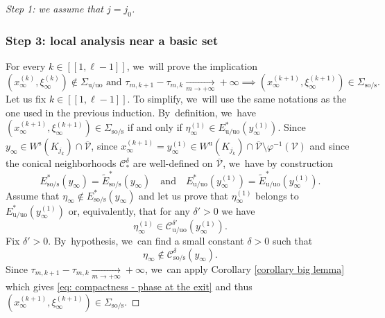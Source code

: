 \documentclass[JEP,XML,SOM,Unicode,NoEqCountersInSection,NoFloatCountersInSection,published]{cedram}
\newcommand{\lcr}{[\![}
\newcommand{\rcr}{]\!]}
\newcommand{\rs}{\mathrm{s}}
\newcommand{\rso}{\mathrm{so}}
\newcommand{\ru}{\mathrm{u}}
\newcommand{\ruo}{\mathrm{uo}}
\theoremstyle{definition}
\theoremstyle{plain}
\newcommand{\Ccal}{\mathcal{C}}
\newcommand{\Vcal}{\mathcal{V}}
\begin{document}
\begin{proof}[Step 1: we assume that $j = j_0$]
\subsubsection*{Step 3: local analysis near a basic set}
For every $k\in\lcr1,\ell-1\rcr$, we~will prove the implication
\begin{equation}\label{eq: compactness - proof implication}
(x_{\infty}^{(k)}, \xi_{\infty}^{(k)}) \!\notin\! \Sigma_{\ru/\ruo} \text{ and } \tau_{m,k +1} - \tau_{m,k} \!\underset{m\to+\infty}{\to}\! + \infty \implies (x_{\infty}^{(k+1)}, \xi_{\infty}^{(k+1)}) \!\in\! \Sigma_{\rso/\rs}.
\end{equation}
Let us fix $k\in\lcr1,\ell-1\rcr$. To simplify, we~will use the same notations as the one used in the previous induction. By~definition, we~have $(x_\infty^{(k+1)},\xi_\infty^{(k+1)}) \in \Sigma_{\rso/\rs}$ if and only if $\eta_{\infty}^{(1)} \in E_{\ru/\ruo}^* (y_{\infty}^{(1)})$. Since $y_{\infty} \in W^\rs (K_{j_k}) \cap \overline{\Vcal}$, since $x_{\infty}^{(k+1)} = y_{\infty}^{(1)} \in W^\ru (K_{j_k}) \cap \overline{\Vcal} \setminus \varphi^{-1} (\Vcal)$ and since the conical neighborhoods $\Ccal_{*}^{\delta}$ are well-defined on $\overline{\Vcal}$, we~have by construction
\[
E_{\rso/\rs}^* (y_{\infty}) = \widetilde{E}_{\rso/\rs}^* (y_{\infty}) \quad \text{and} \quad E_{\ru/\ruo}^* (y_{\infty}^{(1)}) = \widetilde{E}_{\ru/\ruo}^* (y_{\infty}^{(1)}).
\]
Assume that $\eta_{\infty} \notin E_{\rso/\rs}^* (y_{\infty})$ and let us prove that $\eta_{\infty}^{(1)}$ belongs to $E_{\ru/\ruo}^* (y_{\infty}^{(1)})$ or, equivalently, that for any $\delta' > 0$ we have
\begin{equation}\label{eq: compactness - phase at the exit}
\eta_{\infty}^{(1)} \in \Ccal_{\ru/\ruo}^{\delta'} (y_{\infty}^{(1)}).
\end{equation}
Fix $\delta' > 0$. By~hypothesis, we~can find a small constant $\delta > 0$ such that
\[
\eta_{\infty} \notin \Ccal_{\rso/\rs}^{\delta} (y_{\infty}).
\]
Since $\tau_{m,k +1} - \tau_{m,k} \underset{m\to+\infty}{\to} + \infty$, we~can apply Corollary \ref{corollary big lemma} which gives \eqref{eq: compactness - phase at the exit} and thus $(x_{\infty}^{(k+1)}, \xi_{\infty}^{(k+1)}) \in \Sigma_{\rso/\rs}$.


\end{proof}
\end{document}
